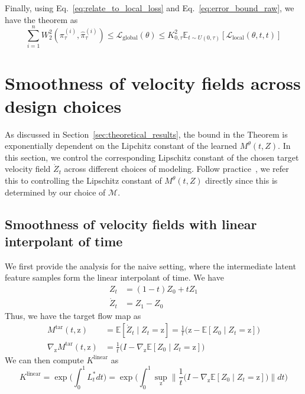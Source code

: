 \documentclass{article}
\begin{document}
Finally, using Eq.~\ref{eq:relate_to_local_loss} and  Eq.~\ref{eq:error_bound_raw}, we have the theorem as
\begin{equation}
    \sum_{i=1}^{n} W_2^2(\pi^{(i)}_{\tau}, \hat{\pi}^{(i)}_{\tau}) \leq \mathcal{L}_{\text{global}}(\theta) \leq K^2_{0,\tau} \mathbb{E}_{t \sim U(0,\tau)}[\mathcal{L}_{\text{local}}(\theta,t,t)]
\end{equation}

\section{Smoothness of velocity fields across design choices}
\label{appedix:Smoothness_design_choices}
As discussed in Section~\ref{sec:theoretical_results}, the bound in the Theorem is exponentially dependent on the Lipchitz constant of the learned $M^{\theta}(t, Z)$. In this section, we control the corresponding Lipschitz constant of the chosen target velocity field $\dot{Z}_t$ across different choices of modeling. Follow practice~\citep{benton2024error}, we refer this to controlling the Lipschitz constant of $M^{\theta}(t, Z)$ directly since this is determined by our choice of $\mathcal{M}$.
\subsection{Smoothness of velocity fields with linear interpolant of time}
\label{appendix:smoothness_linear}
We first provide the analysis for the naive setting, where the intermediate latent feature samples form the linear interpolant of time. We have 
\begin{align}
    Z_t&= (1-t) Z_0 + t Z_1 \\
    \dot{Z}_t &= Z_1- Z_0 
\end{align}
Thus, we have the target flow map as 
\begin{align}
    M^{\text{tar}}(t, \mathrm{z}) &= \mathbb{E}[\dot{Z}_t \mid Z_t = \mathrm{z}] = \frac{1}{t} \Big(\mathrm{z} - \mathbb{E}[Z_0 \mid Z_t = \mathrm{z}] \Big)  \\
     \nabla_{\mathrm{z}}M^{\text{tar}}(t, \mathrm{z}) &= \frac{1}{t} \Big(I - \nabla_{\mathrm{z}} \mathbb{E}[Z_0 \mid Z_t = \mathrm{z}] \Big)
\end{align}
We can then compute $K^{\text{linear}}$ as 
\begin{equation}
    K^{\text{linear}} = \exp \Big(\int_{0}^{1} L^*_t dt \Big) =  \exp \Big(\int_{0}^{1}  \sup_{\mathrm{z}} \Big\|\frac{1}{t}\Big(I - \nabla_{\mathrm{z}} \mathbb{E}[Z_0 \mid Z_t = \mathrm{z}] \Big)  \Big\| dt \Big)
\end{equation}
\end{document}
